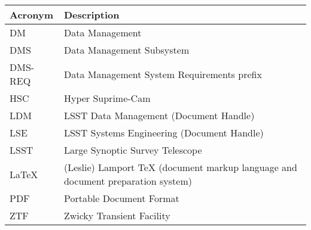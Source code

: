 \addtocounter{table}{-1}
\begin{longtable}{p{}p{}}\hline
\textbf{Acronym} & \textbf{Description}  \\\hline

DM & Data Management \\\hline
DMS & Data Management Subsystem \\\hline
DMS-REQ & Data Management System Requirements prefix \\\hline
HSC & Hyper Suprime-Cam \\\hline
LDM & LSST Data Management (Document Handle) \\\hline
LSE & LSST Systems Engineering (Document Handle) \\\hline
LSST & Large Synoptic Survey Telescope \\\hline
LaTeX & (Leslie) Lamport TeX (document markup language and document preparation system) \\\hline
PDF & Portable Document Format \\\hline
ZTF & Zwicky Transient Facility \\\hline
\end{longtable}

